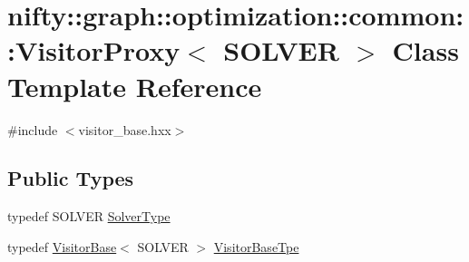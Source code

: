 \hypertarget{classnifty_1_1graph_1_1optimization_1_1common_1_1VisitorProxy}{}\section{nifty\+:\+:graph\+:\+:optimization\+:\+:common\+:\+:Visitor\+Proxy$<$ S\+O\+L\+V\+E\+R $>$ Class Template Reference}
\label{classnifty_1_1graph_1_1optimization_1_1common_1_1VisitorProxy}


{\ttfamily \#include $<$visitor\+\_\+base.\+hxx$>$}

\subsection*{Public Types}
\begin{DoxyCompactItemize}
\item 
typedef S\+O\+L\+V\+E\+R \hyperlink{classnifty_1_1graph_1_1optimization_1_1common_1_1VisitorProxy_a6728a2e754965cff1d6f4dab62aa642e}{Solver\+Type}
\item 
typedef \hyperlink{classnifty_1_1graph_1_1optimization_1_1common_1_1VisitorBase}{Visitor\+Base}$<$ S\+O\+L\+V\+E\+R $>$ \hyperlink{classnifty_1_1graph_1_1optimization_1_1common_1_1VisitorProxy_abeeba329f198f6a6f05f9af13011e7d2}{Visitor\+Base\+Tpe}
\end{DoxyCompactItemize}

